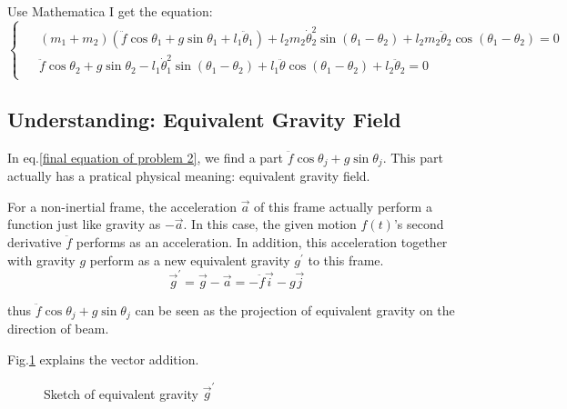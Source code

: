 Use Mathematica I get the equation:
\begin{equation}
    \label{final equation of problem 2}
    \begin{cases}
        \begin{aligned}
            &
            (m_1+m_2)(\ddot{f}\cos\theta_1 + g\sin\theta_1 + l_1 \ddot{\theta}_1)
            +
            l_2m_2\dot{\theta}_2^2 \sin(\theta_1-\theta_2)
            +
            l_2 m_2 \ddot{\theta}_2
            \cos(\theta_1 - \theta_2)=0\\
            &
            \ddot{f}\cos\theta_2
            +
            g\sin\theta_2
            -
            l_1 \dot{\theta}_1^2 \sin(\theta_1 - \theta_2)
            +
            l_1 \ddot{\theta}\cos(\theta_1 - \theta_2)
            +
            l_2\ddot{\theta}_2 = 0
        \end{aligned}
    \end{cases}
\end{equation}

\subsection{Understanding: Equivalent Gravity Field}

In eq.\ref{final equation of problem 2}, we find a part $\ddot{f}\cos\theta_j + g\sin\theta_j$. 
This part actually has a pratical physical meaning: equivalent gravity field.

For a non-inertial frame, the acceleration $\vec{a}$ of this frame actually perform a function just like gravity as $-\vec{a}$. 
In this case, the given motion $f(t)$'s second derivative $\ddot{f}$ performs as an acceleration. 
In addition, this acceleration together with gravity $g$ perform as a new equivalent gravity $g^\prime$ to this frame.
\begin{equation}
    \vec{g}^\prime
    = \vec{g} - \vec{a}=
    -\ddot{f}\vec{i} - g\vec{j}
\end{equation}

thus $\ddot{f}\cos\theta_j + g\sin\theta_j$ can be seen as the projection of equivalent gravity on the direction of beam.

Fig.\ref{Sketch of equivalent gravity} explains the vector addition.
\begin{figure}[H]
    \centering
    \caption{Sketch of equivalent gravity $\vec{g}^\prime$}
    \label{Sketch of equivalent gravity}
\end{figure}

